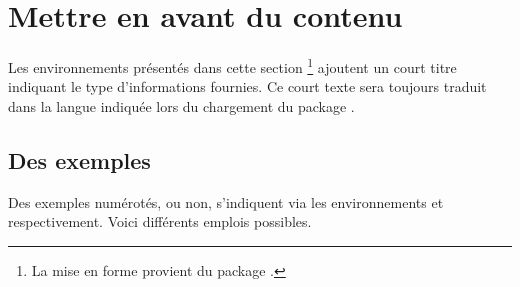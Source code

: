 

\usepackage[lang = french]{../main/main}
\usepackage{../macroenv/macroenv}
\usepackage{../showcase/showcase}
\usepackage{../listing/listing}
\usepackage{../inenglish/inenglish}


\usepackage{focus}




\section{Mettre en avant du contenu}

\begin{bdocnote}
	Les environnements présentés dans cette section
	\footnote{
		La mise en forme provient du package .
	}
	ajoutent un court titre indiquant le type d'informations fournies.
	Ce court texte sera toujours traduit dans la langue indiquée lors du chargement du package .
\end{bdocnote}	




\subsection{Des exemples}

Des exemples numérotés, ou non, s'indiquent via les environnements  et   respectivement. Voici différents emplois possibles.



%
%
%
%
%
%
%


